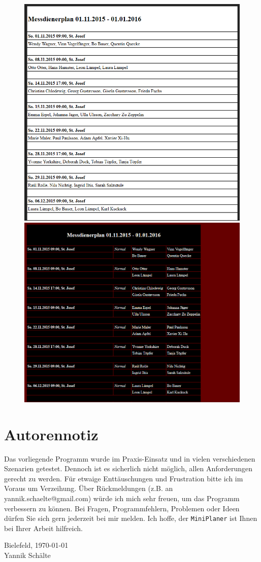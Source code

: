 \documentclass[a4paper,11pt]{article}
\begin{document}
\begin{figure}[h]
\includegraphics[scale=0.3]{html1.PNG}
\includegraphics[scale=0.3]{html2.PNG}
\end{figure}
\section*{Autorennotiz}
Das vorliegende Programm wurde im Praxis-Einsatz und in vielen verschiedenen Szenarien getestet. Dennoch ist es sicherlich nicht möglich, allen Anforderungen gerecht zu werden. Für etwaige Enttäuschungen und Frustration bitte ich im Voraus um Verzeihung. Über Rückmeldungen (z.B. an yannik.schaelte@gmail.com) würde ich mich sehr freuen, um das Programm verbessern zu können. Bei Fragen, Programmfehlern, Problemen oder Ideen dürfen Sie sich gern jederzeit bei mir melden. Ich hoffe, der \texttt{MiniPlaner} ist Ihnen bei Ihrer Arbeit hilfreich.
\vspace*{2cm}

Bielefeld, \today\\
Yannik Schälte
\end{document}
